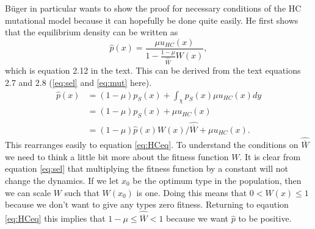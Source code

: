 B{\"u}ger in particular wants to show the proof for necessary conditions of the HC mutational model because it can
hopefully be done quite easily. He first shows that the equilibrium density can be written as 
\begin{equation} \label{eq:HCeq}
\hat{p}(x) = \frac{\mu u_{HC}(x)}{1-\frac{1-\mu}{\hat{\overline{W}}}W(x)},
\end{equation}
which is equation 2.12 in the text. This can be derived from the text equations 2.7 and 2.8 (\ref{eq:sel}
and \ref{eq:mut} here).
\begin{align}
\hat{p}(x) &= (1-\mu)p_S(x) + \int_{\chi}p_S(x) \mu u_{HC}(x)dy \nonumber \\
           &= (1-\mu)p_S(x) + \mu u_{HC}(x) \nonumber\\
           &= (1-\mu)\hat{p}(x)W(x)/\hat{\overline{W}} + \mu u_{HC}(x).
\end{align}
This rearranges easily to equation \ref{eq:HCeq}. To understand the conditions on $\hat{\overline{W}}$ we need to think a
little bit more about the fitness function $W$. It is clear from equation \ref{eq:sel} that multiplying the fitness
function by a constant will not change the dynamics. If we let $x_0$ be the optimum type in the population, then we can
scale $W$ such that $W(x_0)$ is one. Doing this means that $0<W(x)\leq 1$ because we don't want to give any types zero
fitness. Returning to eqaution \ref{eq:HCeq} this implies that $1-\mu \leq \hat{\overline{W}} < 1$ because we want
$\hat{p}$ to be positive. 

